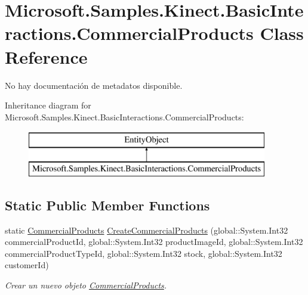 \hypertarget{class_microsoft_1_1_samples_1_1_kinect_1_1_basic_interactions_1_1_commercial_products}{\section{Microsoft.\-Samples.\-Kinect.\-Basic\-Interactions.\-Commercial\-Products Class Reference}
\label{class_microsoft_1_1_samples_1_1_kinect_1_1_basic_interactions_1_1_commercial_products}
}


No hay documentación de metadatos disponible.  


Inheritance diagram for Microsoft.\-Samples.\-Kinect.\-Basic\-Interactions.\-Commercial\-Products\-:\begin{figure}[H]
\begin{center}
\leavevmode
\includegraphics[height=2.000000cm]{class_microsoft_1_1_samples_1_1_kinect_1_1_basic_interactions_1_1_commercial_products}
\end{center}
\end{figure}
\subsection*{Static Public Member Functions}
\begin{DoxyCompactItemize}
\item 
static \hyperlink{class_microsoft_1_1_samples_1_1_kinect_1_1_basic_interactions_1_1_commercial_products}{Commercial\-Products} \hyperlink{class_microsoft_1_1_samples_1_1_kinect_1_1_basic_interactions_1_1_commercial_products_ae0d963df4caa5549b6c6dae7d1b4cd27}{Create\-Commercial\-Products} (global\-::\-System.\-Int32 commercial\-Product\-Id, global\-::\-System.\-Int32 product\-Image\-Id, global\-::\-System.\-Int32 commercial\-Product\-Type\-Id, global\-::\-System.\-Int32 stock, global\-::\-System.\-Int32 customer\-Id)
\begin{DoxyCompactList}\small\item\em Crear un nuevo objeto \hyperlink{class_microsoft_1_1_samples_1_1_kinect_1_1_basic_interactions_1_1_commercial_products}{Commercial\-Products}. \end{DoxyCompactList}\end{DoxyCompactItemize}
